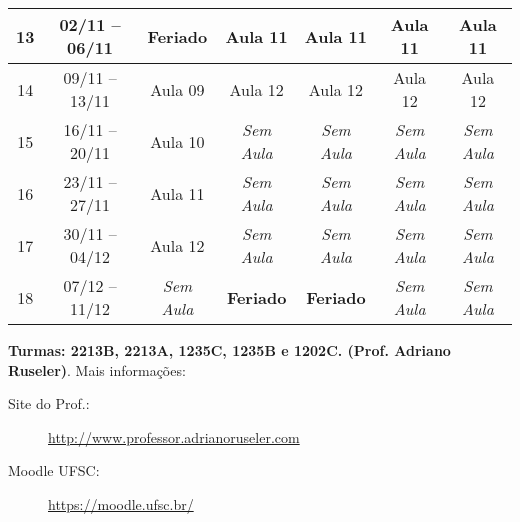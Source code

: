 \documentclass[
	article,			%
	12pt,				%
	twoside,			%
	a4paper,			%
	english,			%
	brazil,				%
	sumario=tradicional
]{abntex2-modelo-plano-de-aula}
\begin{document}
\begin{landscape}
\begin{table}[!h]
{\begin{tabular}{c|c|c|c|c|c|c}
				13       & 02/11 -- 06/11     &  \textbf{Feriado}& Aula 11  & Aula 11  & Aula 11         & Aula 11 \\\hline
				14       & 09/11 -- 13/11       &  Aula 09       & Aula 12  & Aula 12    & Aula 12         & Aula 12 \\\hline
				15       & 16/11 -- 20/11       &  Aula 10       &\textit{ Sem Aula } & \textit{Sem Aula}    & \textit{Sem Aula}        & \textit{Sem Aula} \\\hline
				16       & 23/11 -- 27/11       &  Aula 11       &\textit{ Sem Aula}  & \textit{Sem Aula}    & \textit{Sem Aula}        & \textit{Sem Aula} \\\hline
				17       & 30/11 -- 04/12       &  Aula 12       & \textit{Sem Aula}  & \textit{Sem Aula}    & \textit{Sem Aula}         & \textit{Sem Aula} \\\hline
				18       & 07/12 -- 11/12       &  \textit{Sem Aula}       & \textbf{Feriado}  & \textbf{Feriado}    & \textit{Sem Aula}         & \textit{Sem Aula} \\	
				\bottomrule
			\end{tabular}}
		\end{table}	
		
		\textbf{Turmas:   2213B, 2213A, 1235C, 1235B e 1202C. (Prof. Adriano Ruseler)}.	
		Mais informações: 
		\begin{description}
			\item[Site do Prof.:] \url{http://www.professor.adrianoruseler.com}
			\item[Moodle UFSC:] \url{https://moodle.ufsc.br/}
		\end{description}
		
		
	\end{landscape}	
\end{document}
